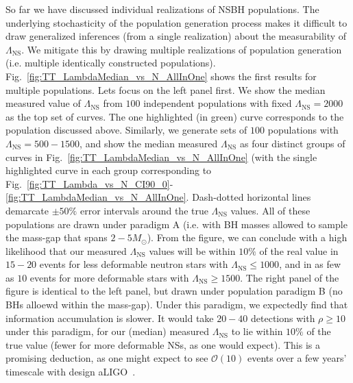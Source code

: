 \documentclass[aps,prd,amsmath,floats,floatfix, twocolumn,
superscriptaddress,nofootinbib,showpacs]{revtex4-1}
\newcommand{\lambdans}{\Lambda_\mathrm{NS}}
\begin{document}
So far we have discussed individual realizations of NSBH populations. The 
underlying stochasticity of the population generation process makes it
difficult to draw generalized inferences (from a single realization) about the
measurability of $\lambdans$. We mitigate this by drawing multiple
realizations of population generation (i.e. multiple identically constructed
populations). Fig.~\ref{fig:TT_LambdaMedian_vs_N_AllInOne} shows the first
results for multiple populations. Lets focus on the left panel first. We
show the median measured value of $\lambdans$ from $100$ independent 
populations with fixed $\lambdans=2000$ as the top set of curves. The one 
highlighted (in green) curve corresponds to the population discussed above.
Similarly, we generate sets of $100$ populations with $\lambdans=500-1500$, and
show the median measured $\lambdans$ as four distinct groups of curves in
Fig.~\ref{fig:TT_LambdaMedian_vs_N_AllInOne} (with the single highlighted
curve in each group corresponding to
Fig.~\ref{fig:TT_Lambda_vs_N_CI90_0}-\ref{fig:TT_LambdaMedian_vs_N_AllInOne}.
Dash-dotted horizontal lines demarcate $\pm50\%$ error intervals around
the true $\lambdans$ values. All of these populations are drawn under
paradigm A (i.e. with BH masses allowed to sample the mass-gap that spans
$2-5M_\odot$).
% 
From the figure, we can conclude with a high likelihood that our measured
$\lambdans$ values will be within $10\%$ of the real value in $15-20$ events
for less deformable neutron stars with $\lambdans\leq 1000$, and in as few as
$10$ events for more deformable stars with $\lambdans\geq 1500$.
% 
The right panel of the figure is identical to the left panel, but drawn under
population paradigm B (no BHs alloewd within the mass-gap). Under this
paradigm, we expectedly find that information accumulation is slower. It would
take $20-40$ detections with $\rho\geq10$ under this paradigm, for our (median)
measured $\lambdans$ to lie within $10\%$ of the true value (fewer for 
more deformable NSs, as one would expect).
% 
This is a promising deduction, as one might expect to see $\mathcal{O}(10)$
events over a few years' timescale with design aLIGO~\cite{Abadie:2010cfa}.
\end{document}
